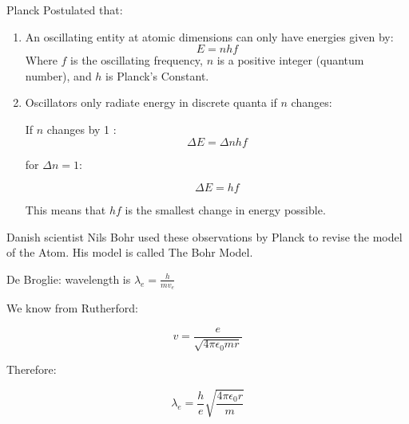 \documentclass{report}
\begin{document}
\begin{description}
\begin{mdframed}
           Planck Postulated that:
           \begin{enumerate}
               \item An oscillating entity at atomic dimensions
                   can only have energies given by:
                   \begin{displaymath}
                        E = nhf
                   \end{displaymath}
                   Where $f$ is the oscillating frequency,
                    $n$ is a positive integer (quantum number),
                    and $h$ is Planck's Constant. 
                \item  Oscillators only radiate energy in
                    discrete quanta if $n$ changes:

                    If  $n$ changes by 1 :
                    \begin{displaymath}
                        \Delta E = \Delta nhf
                    \end{displaymath}

                    for $\Delta n = 1$:

                     \begin{displaymath}
                        \Delta E = hf
                    \end{displaymath}

                    This means that $hf$ is the smallest
                    change in energy possible.
           \end{enumerate}
        \end{mdframed}
        \begin{mdframed}
            Danish scientist Nils Bohr used these observations
            by Planck to revise the model of the Atom. His
            model is called The Bohr Model.
        \end{mdframed}
        \begin{mdframed}
            De Broglie: wavelength is $\lambda_e = \frac{h}{m v_e}$ 

            We know from Rutherford:

            \begin{displaymath}
                v = \frac{e}{\sqrt{4 \pi \epsilon_0 m r}}
            \end{displaymath}

            Therefore:

            \begin{displaymath}
                \lambda_e = \frac{h}{e}\sqrt{\frac{4 \pi \epsilon_0 r}{m}}
            \end{displaymath}
            

\end{mdframed}
\end{description}
\end{document}

